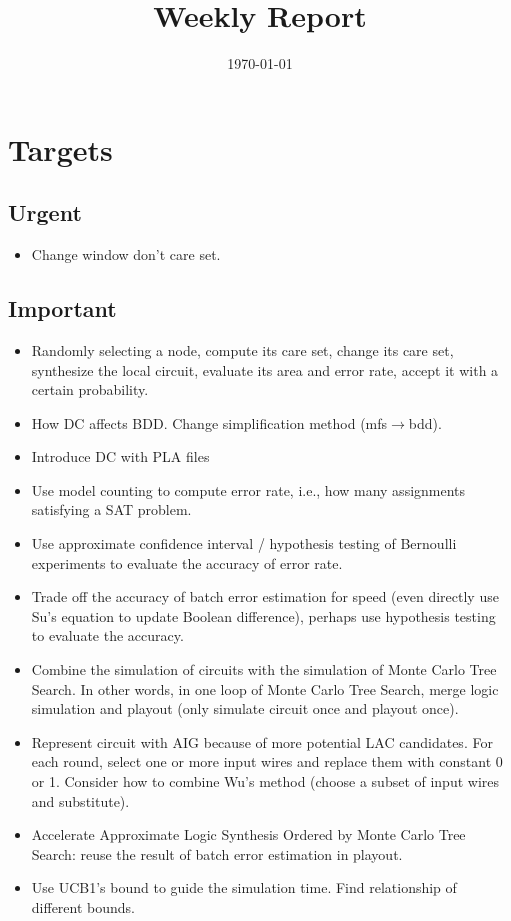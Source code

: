 \documentclass{rpt}
\title{Weekly Report}
\author{}
\date{\today}
\begin{document}
\maketitle

\section{Targets}

\subsection{Urgent}
\begin{itemize}
    \item
        Change window don't care set.
\end{itemize}

\subsection{Important}
\begin{itemize}
    \item
        Randomly selecting a node,
        compute its care set,
        change its care set,
        synthesize the local circuit,
        evaluate its area and error rate,
        accept it with a certain probability.
    \item How DC affects BDD\@.
        Change simplification method (mfs$\rightarrow$bdd).
    \item Introduce DC with PLA files
    \item Use model counting to compute error rate, i.e., how many assignments satisfying a SAT problem.
    \item Use approximate confidence interval / hypothesis testing of Bernoulli experiments to evaluate the accuracy of error rate.
    \item Trade off the accuracy of batch error estimation for speed
        (even directly use Su's equation to update Boolean difference),
        perhaps use hypothesis testing to evaluate the accuracy.
    \item Combine the simulation of circuits with the simulation of Monte Carlo Tree Search.
        In other words,
        in one loop of Monte Carlo Tree Search,
        merge logic simulation and playout (only simulate circuit once and playout once).
    \item Represent circuit with AIG because of more potential LAC candidates.
        For each round, select one or more input wires and replace them with constant 0 or 1.
        Consider how to combine Wu's method (choose a subset of input wires and substitute).
    \item Accelerate Approximate Logic Synthesis Ordered by Monte Carlo Tree Search:
        reuse the result of batch error estimation in playout.
    \item
        Use UCB1's bound to guide the simulation time.
        Find relationship of different bounds.
\end{itemize}
\end{document}
